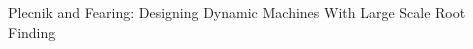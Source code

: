 \documentclass[journal]{IEEEtran}
\begin{document}
%
{Plecnik and Fearing: Designing Dynamic Machines With Large Scale Root Finding}

\maketitle

\begin{abstract}



\end{abstract}
\end{document}
